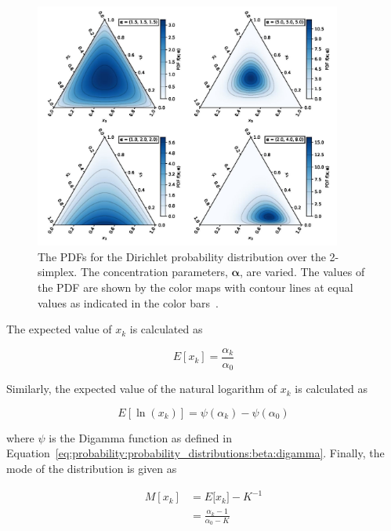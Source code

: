\begin{figure}[htb]
      \centering
      \includegraphics[width=0.9\textwidth]{images/dirichlet.pdf}
      \caption{The \acfp{PDF} for the Dirichlet probability distribution over the 2-simplex. The concentration parameters, $\boldsymbol{\alpha}$, are varied. The values of the \acs{PDF} are shown by the color maps with contour lines at equal values as indicated in the color bars~\cite{ref:dirichlet:2020}.}
      \label{fig:probability:probability_distributions:dirichlet}
\end{figure}

The expected value of $x_{k}$ is calculated as

\begin{equation}
      \label{eq:probability:probability_distributions:dirichlet:expected_value}
      E[x_{k}] = \frac{\alpha_{k}}{\alpha_{0}}
\end{equation}

Similarly, the expected value of the natural logarithm of $x_{k}$ is calculated as

\begin{equation}
      \label{eq:probability:probability_distributions:dirichlet:expected_value_ln}
      E[\ln(x_{k})] = \psi({\alpha_{k}}) - \psi(\alpha_{0})
\end{equation}

where $\psi$ is the Digamma function as defined in Equation~\eqref{eq:probability:probability_distributions:beta:digamma}. Finally, the mode of the distribution is given as

\begin{equation}
      \label{eq:probability:probability_distributions:dirichlet:mode}
      \begin{split}
            M[x_{k}] &= E[{x_{k}] -K^{-1}} \\
            &=  \frac{\alpha_{k} - 1}{\alpha_{0} - K}
      \end{split}
\end{equation}


